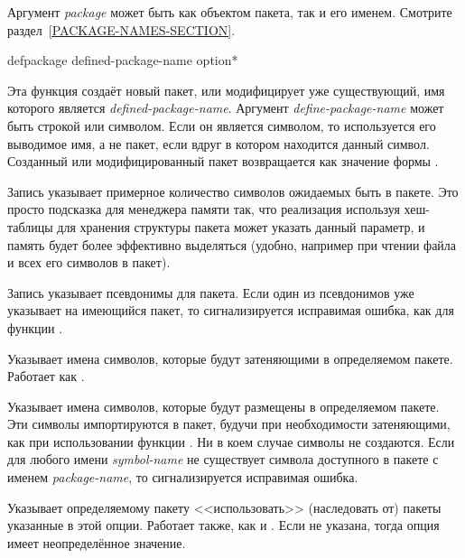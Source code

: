 \begin{defun}[Переменная]
\begin{defun}[Функция]
Аргумент \emph{package} может быть как объектом пакета, так и его
именем. Смотрите раздел~\ref{PACKAGE-NAMES-SECTION}.
\end{defun}

\begin{defmac}
defpackage defined-package-name {option}*

Эта функция создаёт новый пакет, или модифицирует уже существующий, имя которого
является \emph{defined-package-name}. Аргумент \emph{define-package-name} может
быть строкой или символом.
Если он является символом, то используется его выводимое имя, а не пакет, если
вдруг в котором находится данный символ.
Созданный или модифицированный пакет возвращается как значение формы
.

\begin{flushdesc}

\item[\cd{(:size \emph{integer})}]
Запись указывает примерное количество символов ожидаемых быть в пакете. 
Это просто подсказка для менеджера памяти так, что реализация используя
хеш-таблицы для хранения структуры пакета может указать данный параметр, и
память будет более эффективно выделяться (удобно, например при чтении файла и
всех его символов в пакет).

\item[\cd{(:nicknames \Mstar\emph{package-name})}]
Запись указывает псевдонимы для пакета.
Если один из псевдонимов уже указывает на имеющийся пакет, то сигнализируется
исправимая ошибка, как для функции .

\item[\cd{(:shadow \Mstar\emph{symbol-name})}]
Указывает имена символов, которые будут затеняющими в определяемом
пакете. Работает как .

\item[\cd{(:shadowing-import-from \emph{package-name} \Mstar\emph{symbol-name})}]
Указывает имена символов, которые будут размещены в определяемом пакете.
Эти символы импортируются в пакет, будучи при необходимости затеняющими, как при
использовании функции .
Ни в коем случае символы не создаются.
Если для любого имени \emph{symbol-name} не существует символа доступного в
пакете с именем \emph{package-name}, то сигнализируется исправимая ошибка.

\item[\cd{(:use \Mstar\emph{package-name})}]
Указывает определяемому пакету <<использовать>> (наследовать от) пакеты
указанные в этой опции. Работает также, как и .
Если  не указана, тогда опция имеет неопределённое значение.


\end{flushdesc}
\end{defmac}
\end{defun}
